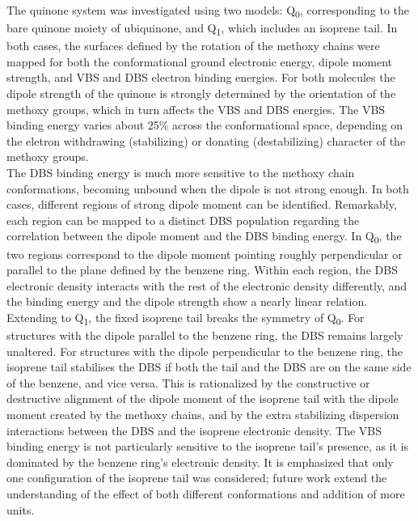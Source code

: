 The quinone system was investigated using two models: Q\textsubscript{0}, corresponding to the bare quinone moiety of ubiquinone, and Q\textsubscript{1}, which includes an isoprene tail. In both cases, the surfaces defined by the rotation of the methoxy chains were mapped for both the conformational ground electronic energy, dipole moment strength, and VBS and DBS electron binding energies. 
For both molecules the dipole strength of the quinone is strongly determined by the orientation of the methoxy groups, which in turn affects the VBS and DBS energies. The VBS binding energy varies about 25\% across the conformational space, depending on the eletron withdrawing (stabilizing) or donating (destabilizing) character of the methoxy groups. \\
The DBS binding energy is much more sensitive to the methoxy chain conformations, becoming unbound when the dipole is not strong enough. In both cases, different regions of strong dipole moment can be identified. Remarkably, each region can be mapped to a distinct DBS population regarding the correlation between the dipole moment and the DBS binding energy. In Q\textsubscript{0}, the two regions correspond to the dipole moment pointing roughly perpendicular or parallel to the plane defined by the benzene ring. Within each region, the DBS electronic density interacts with the rest of the electronic density differently, and the binding energy and the dipole strength show a nearly linear relation.\\
Extending to Q\textsubscript{1}, the fixed isoprene tail breaks the symmetry of Q\textsubscript{0}. For structures with the dipole parallel to the benzene ring, the DBS remains largely unaltered. For structures with the dipole perpendicular to the benzene ring, the isoprene tail stabilises the DBS if both the tail and the DBS are on the same side of the benzene, and vice versa. This is rationalized by the constructive or destructive alignment of the dipole moment of the isoprene tail with the dipole moment created by the methoxy chains, and by the extra stabilizing dispersion interactions between the DBS and the isoprene electronic density. The VBS binding energy is not particularly sensitive to the isoprene tail's presence, as it is dominated by the benzene ring's electronic density. It is emphasized that only one configuration of the isoprene tail was considered; future work extend the understanding of the effect of both different conformations and addition of more units.\\

